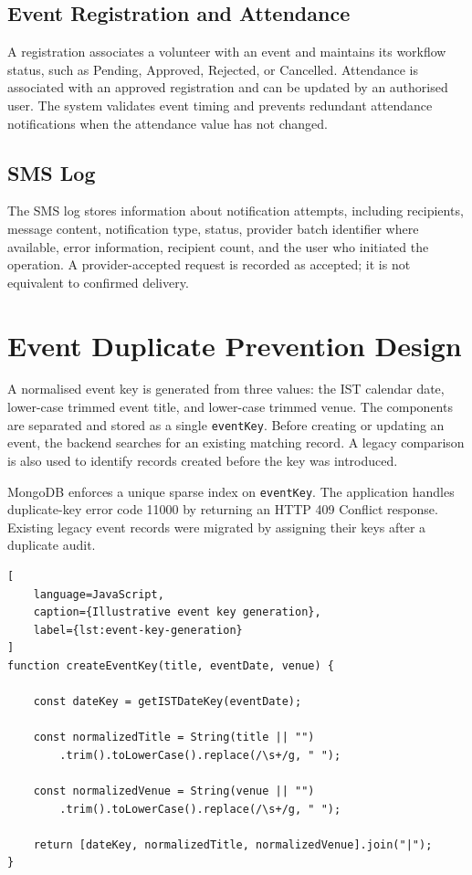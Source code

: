 \documentclass[12pt,a4paper,oneside]{report}
\begin{document}
\subsection{Event Registration and Attendance}
A registration associates a volunteer with an event and maintains its workflow status, such as Pending, Approved, Rejected, or Cancelled. Attendance is associated with an approved registration and can be updated by an authorised user. The system validates event timing and prevents redundant attendance notifications when the attendance value has not changed.

\subsection{SMS Log}
The SMS log stores information about notification attempts, including recipients, message content, notification type, status, provider batch identifier where available, error information, recipient count, and the user who initiated the operation. A provider-accepted request is recorded as accepted; it is not equivalent to confirmed delivery.


\section{Event Duplicate Prevention Design}

A normalised event key is generated from three values:
the IST calendar date, lower-case trimmed event title,
and lower-case trimmed venue. The components are
separated and stored as a single \texttt{eventKey}.
Before creating or updating an event, the backend
searches for an existing matching record. A legacy
comparison is also used to identify records created
before the key was introduced.

MongoDB enforces a unique sparse index on
\texttt{eventKey}. The application handles
duplicate-key error code 11000 by returning an
HTTP 409 Conflict response. Existing legacy event
records were migrated by assigning their keys after
a duplicate audit.

\begin{lstlisting}[
    language=JavaScript,
    caption={Illustrative event key generation},
    label={lst:event-key-generation}
]
function createEventKey(title, eventDate, venue) {

    const dateKey = getISTDateKey(eventDate);

    const normalizedTitle = String(title || "")
        .trim().toLowerCase().replace(/\s+/g, " ");

    const normalizedVenue = String(venue || "")
        .trim().toLowerCase().replace(/\s+/g, " ");

    return [dateKey, normalizedTitle, normalizedVenue].join("|");
}
\end{lstlisting}
\end{document}
